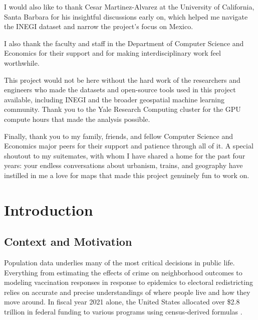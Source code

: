 \documentclass[12pt,letterpaper]{article}
\begin{document}
I would also like to thank Cesar Martinez-Alvarez at the University of California, Santa Barbara for his insightful discussions early on, which helped me navigate the INEGI dataset and narrow the project's focus on Mexico.

I also thank the faculty and staff in the Department of Computer Science and Economics for their support and for making interdisciplinary work feel worthwhile.

This project would not be here without the hard work of the researchers and engineers who made the datasets and open-source tools used in this project available, including INEGI and the broader geospatial machine learning community. Thank you to the Yale Research Computing cluster for the GPU compute hours that made the analysis possible.

Finally, thank you to my family, friends, and fellow Computer Science and Economics major peers for their support and patience through all of it. A special shoutout to my suitemates, with whom I have shared a home for the past four years: your endless conversations about urbanism, trains, and geography have instilled in me a love for maps that made this project genuinely fun to work on.

\newpage

{
  \setlength{\parskip}{0pt}
  \tableofcontents
}
\newpage

\clearpage
{}

\section{Introduction}
\subsection{Context and Motivation}
\label{sub:contextandmotivation}
Population data underlies many of the most critical decisions in public life. Everything from estimating the effects of crime on neighborhood outcomes to modeling vaccination responses in response to epidemics to electoral redistricting relies on accurate and precise understandings of where people live and how they move around. In fiscal year 2021 alone, the United States allocated over \$2.8 trillion in federal funding to various programs using census-derived formulas \parencite{USCensus2023Funding}.
\end{document}
